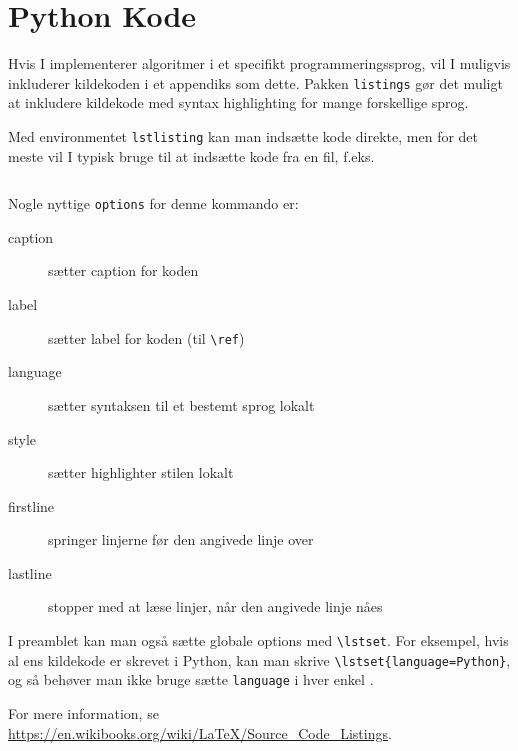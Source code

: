 
\chapter{Python Kode}
\label{app:code}

Hvis I implementerer algoritmer i et specifikt programmeringssprog, vil I muligvis inkluderer kildekoden i et appendiks som dette.
Pakken \texttt{listings} gør det muligt at inkludere kildekode med syntax highlighting for mange forskellige sprog.

Med environmentet \texttt{lstlisting} kan man indsætte kode direkte, men for det meste vil I typisk bruge \verb!! til at indsætte kode fra en fil, f.eks.
%
\begin{verbatim}

\end{verbatim}
%
Nogle nyttige \texttt{options} for denne kommando er:
%
\begin{description}
\item[caption] sætter caption for koden
\item[label] sætter label for koden (til \verb!\ref!)
\item[language] sætter syntaksen til et bestemt sprog lokalt
\item[style] sætter highlighter stilen lokalt
\item[firstline] springer linjerne før den angivede linje over 
\item[lastline] stopper med at læse linjer, når den angivede linje nåes
\end{description}
%
I preamblet kan man også sætte globale options med \verb!\lstset!.
For eksempel, hvis al ens kildekode er skrevet i Python, kan man skrive \verb!\lstset{language=Python}!, og så behøver man ikke bruge sætte \texttt{language} i hver enkel \verb!!.



For mere information, se \url{https://en.wikibooks.org/wiki/LaTeX/Source_Code_Listings}.